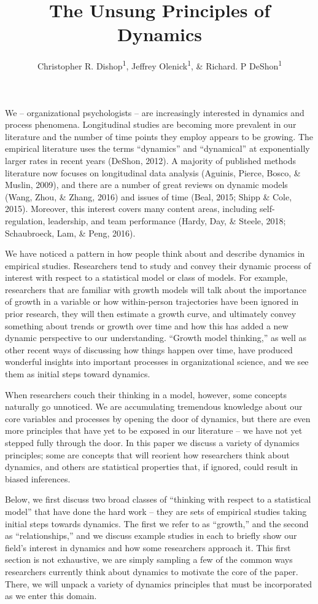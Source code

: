 \documentclass[english,,man]{apa6}
\title{The Unsung Principles of Dynamics}
\author{Christopher R. Dishop\textsuperscript{1}, Jeffrey
Olenick\textsuperscript{1}, \& Richard. P DeShon\textsuperscript{1}}
\date{}
\affiliation{
\vspace{0.5cm}
\textsuperscript{1} Michigan State University}
\theoremstyle{definition}
\theoremstyle{definition}
\theoremstyle{definition}
\theoremstyle{remark}
\begin{document}
\maketitle

We -- organizational psychologists -- are increasingly interested in
dynamics and process phenomena. Longitudinal studies are becoming more
prevalent in our literature and the number of time points they employ
appears to be growing. The empirical literature uses the terms
\enquote{dynamics} and \enquote{dynamical} at exponentially larger rates
in recent years (DeShon, 2012). A majority of published methods
literature now focuses on longitudinal data analysis (Aguinis, Pierce,
Bosco, \& Muslin, 2009), and there are a number of great reviews on
dynamic models (Wang, Zhou, \& Zhang, 2016) and issues of time (Beal,
2015; Shipp \& Cole, 2015). Moreover, this interest covers many content
areas, including self-regulation, leadership, and team performance
(Hardy, Day, \& Steele, 2018; Schaubroeck, Lam, \& Peng, 2016).

We have noticed a pattern in how people think about and describe
dynamics in empirical studies. Researchers tend to study and convey
their dynamic process of interest with respect to a statistical model or
class of models. For example, researchers that are familiar with growth
models will talk about the importance of growth in a variable or how
within-person trajectories have been ignored in prior research, they
will then estimate a growth curve, and ultimately convey something about
trends or growth over time and how this has added a new dynamic
perspective to our understanding. \enquote{Growth model thinking,} as
well as other recent ways of discussing how things happen over time,
have produced wonderful insights into important processes in
organizational science, and we see them as initial steps toward
dynamics.

When researchers couch their thinking in a model, however, some concepts
naturally go unnoticed. We are accumulating tremendous knowledge about
our core variables and processes by opening the door of dynamics, but
there are even more principles that have yet to be exposed in our
literature -- we have not yet stepped fully through the door. In this
paper we discuss a variety of dynamics principles; some are concepts
that will reorient how researchers think about dynamics, and others are
statistical properties that, if ignored, could result in biased
inferences.

Below, we first discuss two broad classes of \enquote{thinking with
respect to a statistical model} that have done the hard work -- they are
sets of empirical studies taking initial steps towards dynamics. The
first we refer to as \enquote{growth,} and the second as
\enquote{relationships,} and we discuss example studies in each to
briefly show our field's interest in dynamics and how some researchers
approach it. This first section is not exhaustive, we are simply
sampling a few of the common ways researchers currently think about
dynamics to motivate the core of the paper. There, we will unpack a
variety of dynamics principles that must be incorporated as we enter
this domain.
\end{document}
